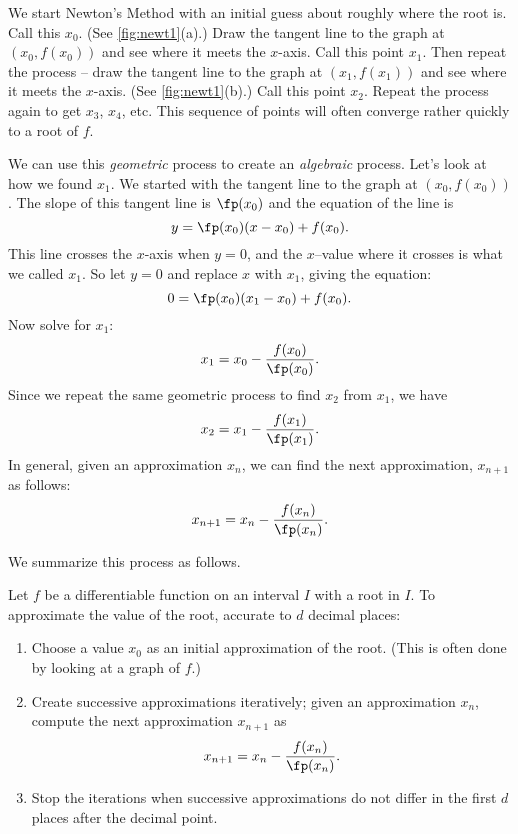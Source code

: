 We start Newton's Method with an initial guess about roughly where the root is.  Call this $x_0$. (See \autoref{fig:newt1}(a).)  Draw the tangent line to the graph at $(x_0,f(x_0))$ and see where it meets the $x$-axis. Call this point $x_1$.  Then repeat the process -- draw the tangent line to the graph at $(x_1, f(x_1))$ and see where it meets the $x$-axis. (See \autoref{fig:newt1}(b).) Call this point $x_2$.  Repeat the process again to get $x_3$, $x_4$, etc.  This sequence of points will often converge rather quickly to a root of $f$.  

We can use this \textit{geometric} process to create an \textit{algebraic} process.  Let's look at how we found $x_1$.  We started with the tangent line to the graph at $(x_0,f(x_0))$.  The slope of this tangent line is $\fp(x_0)$ and the equation of the line is
$$y=\fp(x_0)(x-x_0)+f(x_0).$$
This line crosses the $x$-axis when $y=0$, and the $x$--value where it crosses is what we called $x_1$. So let $y=0$ and replace $x$ with $x_1$, giving the equation: 
$$ 0 = \fp(x_0)(x_1-x_0)+f(x_0).$$ 
Now solve for $x_1$:
$$x_1=x_0-\frac{f(x_0)}{\fp(x_0)}.$$
Since we repeat the same geometric process to find $x_2$ from $x_1$, we have
$$x_2=x_1-\frac{f(x_1)}{\fp(x_1)}.$$
In general, given an approximation $x_n$, we can find the next approximation, $x_{n+1}$ as follows:
$$x_{n+1} = x_{n} - \frac{f(x_{n})}{\fp(x_{n})}.$$

We summarize this process as follows.

{Let $f$ be a differentiable function on an interval $I$ with a root in $I$. To approximate the value of the root, accurate to $d$ decimal places:
\begin{enumerate}
	\item		Choose a value $x_0$ as an initial approximation of the root. (This is often done by looking at a graph of $f$.)
	\item		Create successive approximations iteratively; given an approximation $x_n$, compute the next approximation $x_{n+1}$ as $$x_{n+1} = x_n - \frac{f(x_n)}{\fp(x_n)}.$$
	\item		Stop the iterations when successive approximations do not differ in the first $d$ places after the decimal point.
\end{enumerate}}


